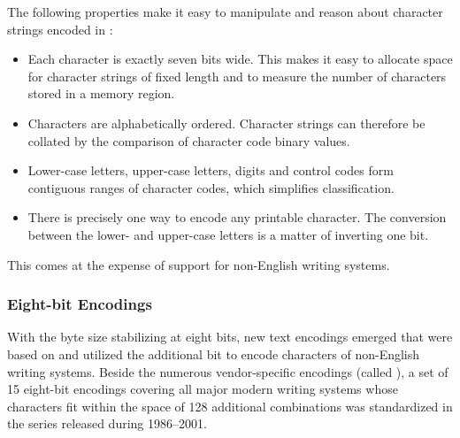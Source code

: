\documentclass{book}
\begin{document}

The following properties make it easy to manipulate and reason about character
strings encoded in :
\begin{itemize}
  \item Each character is exactly seven bits wide. This makes it easy to
    allocate space for character strings of fixed length and to measure the
    number of characters stored in a memory region.
  \item Characters are alphabetically ordered. Character strings can therefore
    be collated by the comparison of character code binary values.
  \item Lower-case letters, upper-case letters, digits and control codes form
    contiguous ranges of character codes, which simplifies classification.
  \item There is precisely one way to encode any printable character. The
    conversion between the lower- and upper-case letters is a matter of
    inverting one bit.
\end{itemize}
This comes at the expense of support for non-English writing systems.

\subsubsection{Eight-bit Encodings}
With the byte size stabilizing at eight bits, new text encodings emerged that
were based on  and utilized the additional bit to encode
characters of non-English writing systems. Beside the numerous vendor-specific
encodings (called ), a set of 15 eight-bit encodings
covering all major modern writing systems whose characters fit within the space
of 128 additional combinations was standardized in the
 series released during 1986--2001.
\end{document}
